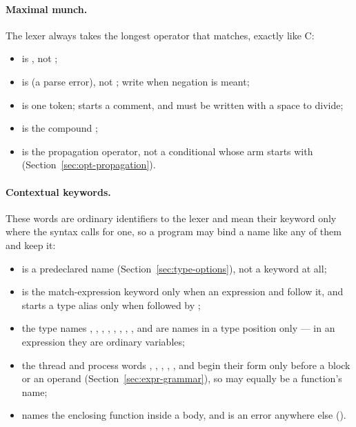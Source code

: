 \paragraph{Maximal munch.} The lexer always takes the longest operator
that matches, exactly like C:
\begin{itemize}[nosep]
\item {} is , not ;
\item {} is  (a parse error), not ;
      write  when negation is meant;
\item \ic{/=} is one token; \ic{//} starts a comment, and
       must be written with a space to divide;
\item {} is the compound ;
\item {} is the propagation operator, not a conditional  whose
      arm starts with  (Section~\ref{sec:opt-propagation}).
\end{itemize}

\paragraph{Contextual keywords.} These words are ordinary identifiers to
the lexer and mean their keyword only where the syntax calls for one, so a
program may bind a name like any of them and keep it:

\begin{itemize}[nosep]
\item {} is a predeclared name (Section~\ref{sec:type-options}), not
  a keyword at all;
\item {} is the match-expression keyword only when an expression
  and \ic{\{} follow it, and  starts a type alias only when
  followed by ;
\item the type names , , , ,
  , , , ,  and  are
  names in a type position only --- in an expression they are ordinary
  variables;
\item the thread and process words , , ,
  , ,  and  begin their form only
  before a block or an operand (Section~\ref{sec:expr-grammar}), so
   may equally be a function's name;
\item {} names the enclosing function inside a  body, and
  is an error anywhere else ().
\end{itemize}
